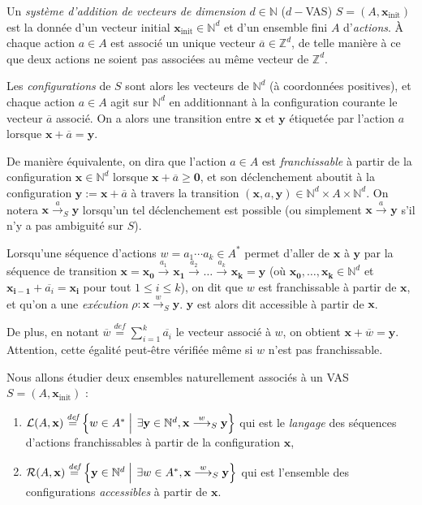 \documentclass[a4paper,final]{article}
\theoremstyle{definition}
\let\leq\leqslant
\let\geq\geqslant
\newcommand{\set}[2]{\left\{#1\mathrel{\left|\vphantom{#1}\vphantom{#2}\right.}#2\right\}}
\newcommand{\defeq}{\ensuremath{\stackrel{\textit{def}}{=}}}
\newcommand{\N}{\ensuremath{\mathbb{N}}}
\newcommand{\Z}{\ensuremath{\mathbb{Z}}}
\newcommand{\lang}{\ensuremath{\mathcal{L}}}
\newcommand{\conf}{\ensuremath{\mathcal{R}}}
\newcommand{\trans}[2]{\ensuremath{\stackrel{#1}{\longrightarrow}_{#2}}}
\newcommand{\vect}[1]{\ensuremath{\mathbf{#1}}}
\newcommand{\xinit}{\ensuremath{\vect{x}_\text{init}}}
\newcommand{\valeur}[1]{\ensuremath{\overline{#1}}}
\begin{document}
Un \emph{système d'addition de vecteurs de dimension} $d\in\N$ ($d-$VAS) $S=(A,\xinit)$ est la donnée d'un vecteur initial $\xinit\in\N^d$ et d'un ensemble fini $A$ d'\emph{actions}.
À chaque action $a\in A$ est associé un unique vecteur $\valeur{a}\in \Z^d$, de telle manière à ce que deux actions ne soient pas associées au même vecteur de $\Z^d$.
\vspace{3mm}

Les \emph{configurations} de $S$ sont alors les vecteurs de $\N^d$ (à coordonnées positives), 
et chaque action $a\in A$ agit sur $\N^d$ en additionnant à la configuration courante le vecteur $\valeur{a}$ associé.
On a alors une transition entre $\vect{x}$ et $\vect{y}$ étiquetée par l'action $a$ lorsque $\vect{x} + \valeur{a} = \vect{y}$.

De manière équivalente, on dira que l'action $a\in A$ est \emph{franchissable} 
à partir de la configuration $\vect{x}\in \N^d$ lorsque $\vect{x} + \valeur{a} \geq \vect{0}$,
et son déclenchement aboutit à la configuration $\vect{y} := \vect{x} + \valeur{a}$ à travers la transition $(\vect{x},a,\vect{y})\in \N^d\times A\times \N^d$.
On notera $\vect{x}\trans{a}{S} \vect{y}$ lorsqu'un tel déclenchement est possible (ou simplement $\vect{x}\trans{a}{} \vect{y}$ s'il n'y a pas ambiguité sur $S$).
\vspace{3mm}

Lorsqu'une séquence d'actions $w= a_1\cdots a_k\in A^\ast$ permet d'aller de $\vect{x}$ à $\vect{y}$ par la séquence de transition $\vect{x}= \vect{x_0}\trans{a_1}{} \vect{x_1}\trans{a_2}{} \dots\trans{a_k}{} \vect{x_k}=\vect{y}$
(où $\vect{x_0},\dots,\vect{x_k} \in\N^d$ et $\vect{x_{i-1}} +\valeur{a_i} =\vect{x_i}$ pour tout $1\leq i\leq k$),
on dit que $w$ est franchissable à partir de $\vect{x}$, et qu'on a une \emph{exécution} $\rho :\vect{x}\trans{w}{S} \vect{y}$.
$\vect{y}$ est alors dit accessible à partir de $\vect{x}$.

De plus, en notant $\valeur{w}\defeq \sum^k_{i=1} \valeur{a_i}$ le vecteur associé à $w$, on obtient $\vect{x} +\valeur{w} = \vect{y}$.
Attention, cette égalité peut-être vérifiée même si $w$ n'est pas franchissable.
\vspace{3mm}

Nous allons étudier deux ensembles naturellement associés à un VAS $S=(A,\xinit)$ :
\begin{enumerate}
    \item 
    $\lang(A,\vect{x})\defeq \set{w\in A^\ast} {\exists \vect{y}\in\N^d, \vect{x}\trans{w}{S}\vect{y}}$ qui est le \emph{langage} des séquences d'actions franchissables à partir de la configuration $\vect{x}$,
    
    \item $\conf(A,\vect{x})\defeq \set{\vect{y}\in\N^d} {\exists w\in A^\ast, \vect{x}\trans{w}{S} \vect{y}}$ qui est l'ensemble des configurations \emph{accessibles} à partir de $\vect{x}$. 
\end{enumerate}
\end{document}

